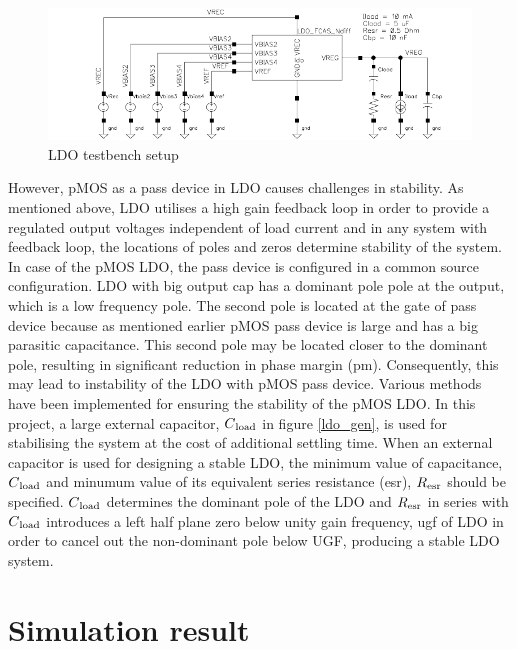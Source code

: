 \documentclass[12pt,a4paper,UKenglish]{report}
\begin{document}
\begin{figure}[htbp] %
   \centering
   \includegraphics[width=1\textwidth]{img/ldo_testbench.pdf} 
   \caption{LDO testbench setup}
   \label{fig:ldo_testbench}
\end{figure}

However, pMOS as a pass device in LDO causes challenges in stability. As mentioned above, LDO utilises a high 
gain feedback loop in order to provide a regulated output voltages independent of load current and in any system 
with feedback loop, the locations of poles and zeros determine stability of the system.  In case of the pMOS LDO, 
the pass device is configured in a common source configuration. LDO with big output cap has a dominant pole pole 
at the output, which is a low frequency pole. The second pole is located at the gate of pass device because as 
mentioned earlier pMOS pass device is large and has a big parasitic capacitance. This second pole may be located 
closer to the dominant pole, resulting in significant  reduction in phase margin (\acrshort{pm}). Consequently, 
this may lead to instability of the LDO with pMOS pass device.  Various methods have been implemented for 
ensuring the stability of the pMOS LDO. In this project, a large external capacitor, $C\textsubscript{load}$ in 
figure \ref{ldo_gen}, is used for stabilising the system at the cost of additional settling time. When an 
external capacitor is used for designing a stable LDO, the minimum value of capacitance, $C\textsubscript{load}$ 
and minumum value of its equivalent series resistance (\acrshort{esr}), $R\textsubscript{esr}$ should be 
specified\cite{ldo_ti_stability}. $C\textsubscript{load}$ determines the dominant pole of the LDO and 
$R\textsubscript{esr}$ in series with $C\textsubscript{load}$ introduces a left half plane zero below unity 
gain frequency, \acrshort{ugf} of LDO in order to cancel out the non-dominant pole below UGF, producing a 
stable LDO system. \\

\section{Simulation result}
\end{document}
